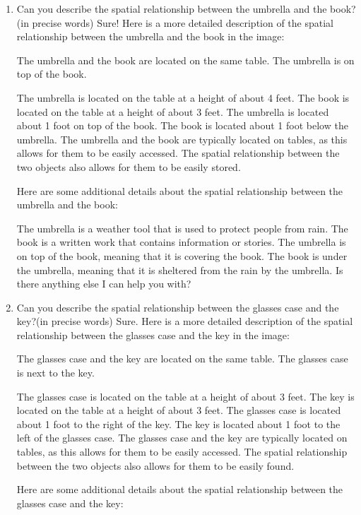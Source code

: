 \begin{enumerate}
    \item Can you describe the spatial relationship between the umbrella and the book?(in precise words)
    \subitem Sure! Here is a more detailed description of the spatial relationship between the umbrella and the book in the image:

    The umbrella and the book are located on the same table. The umbrella is on top of the book.
    
    The umbrella is located on the table at a height of about 4 feet.
    The book is located on the table at a height of about 3 feet.
    The umbrella is located about 1 foot on top of the book.
    The book is located about 1 foot below the umbrella.
    The umbrella and the book are typically located on tables, as this allows for them to be easily accessed. The spatial relationship between the two objects also allows for them to be easily stored.
    
    Here are some additional details about the spatial relationship between the umbrella and the book:
    
    The umbrella is a weather tool that is used to protect people from rain.
    The book is a written work that contains information or stories.
    The umbrella is on top of the book, meaning that it is covering the book.
    The book is under the umbrella, meaning that it is sheltered from the rain by the umbrella.
    Is there anything else I can help you with?
    \item Can you describe the spatial relationship between the glasses case and the key?(in precise words)
    \subitem Sure. Here is a more detailed description of the spatial relationship between the glasses case and the key in the image:

    The glasses case and the key are located on the same table. The glasses case is next to the key.
    
    The glasses case is located on the table at a height of about 3 feet.
    The key is located on the table at a height of about 3 feet.
    The glasses case is located about 1 foot to the right of the key.
    The key is located about 1 foot to the left of the glasses case.
    The glasses case and the key are typically located on tables, as this allows for them to be easily accessed. The spatial relationship between the two objects also allows for them to be easily found.
    
    Here are some additional details about the spatial relationship between the glasses case and the key:
    

\end{enumerate}
